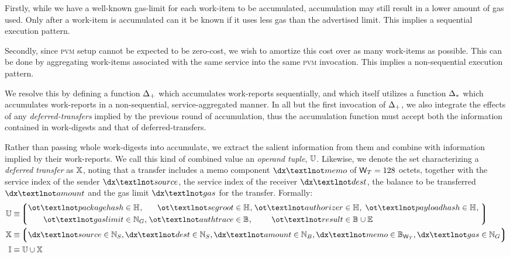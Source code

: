 Firstly, while we have a well-known gas-limit for each work-item to be accumulated, accumulation may still result in a lower amount of gas used. Only after a work-item is accumulated can it be known if it uses less gas than the advertised limit. This implies a sequential execution pattern.

Secondly, since \textsc{pvm} setup cannot be expected to be zero-cost, we wish to amortize this cost over as many work-items as possible. This can be done by aggregating work-items associated with the same service into the same \textsc{pvm} invocation. This implies a non-sequential execution pattern.

We resolve this by defining a function $\Delta_+$ which accumulates work-reports sequentially, and which itself utilizes a function $\Delta_*$ which accumulates work-reports in a non-sequential, service-aggregated manner. In all but the first invocation of $\Delta_+$, we also integrate the effects of any \emph{deferred-transfers} implied by the previous round of accumulation, thus the accumulation function must accept both the information contained in work-digests and that of deferred-transfers.

Rather than passing whole work-digests into accumulate, we extract the salient information from them and combine with information implied by their work-reports. We call this kind of combined value an \emph{operand tuple}, $\mathbb{U}$. Likewise, we denote the set characterizing a \emph{deferred transfer} as $\mathbb{X}$, noting that a transfer includes a memo component $\dx¬memo$ of $\mathsf{W}_T = 128$ octets, together with the service index of the sender $\dx¬source$, the service index of the receiver $\dx¬dest$, the balance to be transferred $\dx¬amount$ and the gas limit $\dx¬gas$ for the transfer. Formally:
\begin{align}
  \label{eq:operandtuple}
  \operandtuple &\equiv \tuple{
    \begin{alignedat}{5}
      \isa{\ot¬packagehash&}{\hash},\;
      \isa{&\ot¬segroot&}{\hash},\;
      \isa{&\ot¬authorizer&}{\hash},\;
      \isa{\ot¬payloadhash}{\hash},\;\\
      \isa{\ot¬gaslimit&}{\gas},\;
      \isa{&\ot¬authtrace&}{\blob},\;
      \isa{&\ot¬result&}{\blob \cup \workerror}
    \end{alignedat}
  }\\
  \label{eq:defxfer}
  \defxfer &\equiv \tuple{
    \isa{\dx¬source}{\serviceid} ,
    \isa{\dx¬dest}{\serviceid} ,
    \isa{\dx¬amount}{\balance} ,
    \isa{\dx¬memo}{\memo} ,
    \isa{\dx¬gas}{\gas}
  }\\
  \label{eq:accinput}
  \accinput &\equiv \operandtuple \cup \defxfer
\end{align}

